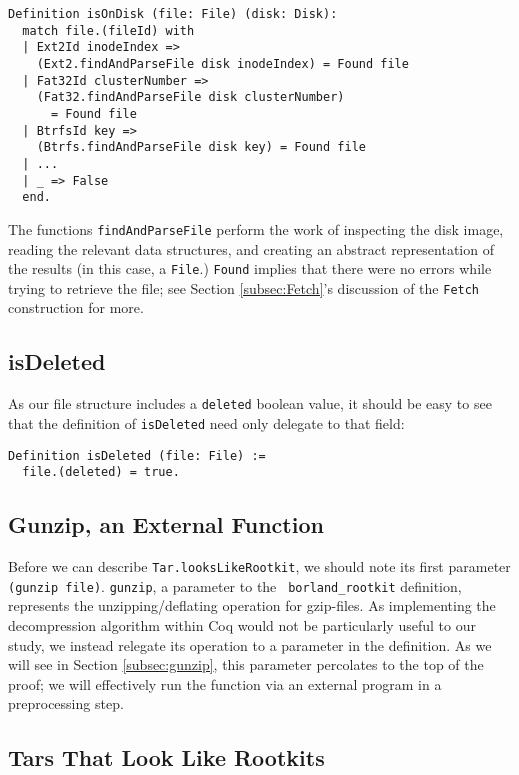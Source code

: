 \documentclass[nocopyrightspace]{sigplanconf}
\begin{document}
\begin{lstlisting}
Definition isOnDisk (file: File) (disk: Disk):
  match file.(fileId) with
  | Ext2Id inodeIndex =>
    (Ext2.findAndParseFile disk inodeIndex) = Found file
  | Fat32Id clusterNumber =>
    (Fat32.findAndParseFile disk clusterNumber)
      = Found file
  | BtrfsId key =>
    (Btrfs.findAndParseFile disk key) = Found file
  | ...
  | _ => False
  end.
\end{lstlisting}

The functions {\tt findAndParseFile} perform the work of inspecting the disk
image, reading the relevant data structures, and creating an abstract
representation of the results (in this case, a {\tt File}.) {\tt Found}
implies that there were no errors while trying to retrieve the file; see
Section \ref{subsec:Fetch}'s discussion of the {\tt Fetch} construction for
more.

\subsection{isDeleted}

As our file structure includes a {\tt deleted} boolean value, it should be
easy to see that the definition of {\tt isDeleted} need only delegate to that
field:

\begin{lstlisting}
Definition isDeleted (file: File) :=
  file.(deleted) = true.
\end{lstlisting}

\subsection{Gunzip, an External Function}

Before we can describe {\tt Tar.looksLikeRootkit}, we should note its first
parameter {\tt (gunzip file)}. {\tt gunzip}, a parameter to the {\tt
borland\_rootkit} definition, represents the unzipping/deflating operation for
gzip-files. As implementing the decompression algorithm within Coq would not
be particularly useful to our study, we instead relegate its operation to a
parameter in the definition. As we will see in Section \ref{subsec:gunzip},
this parameter percolates to the top of the proof; we will effectively run the
function via an external program in a preprocessing step.

\subsection{Tars That Look Like Rootkits}
\end{document}
